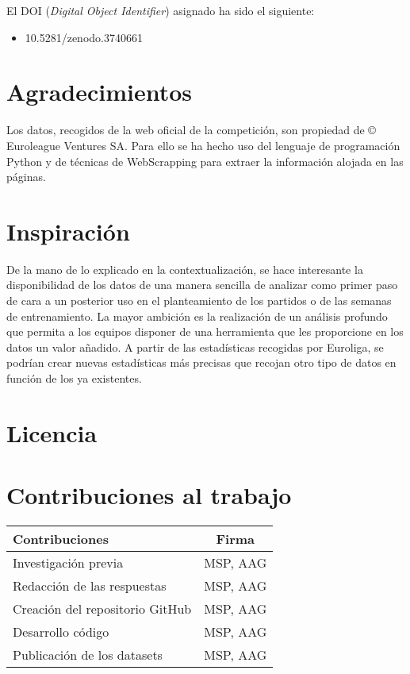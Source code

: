 \documentclass[]{article}
\providecommand{\tightlist}{%
  \setlength{\itemsep}{0pt}\setlength{\parskip}{0pt}}
\begin{document}
El DOI (\emph{Digital Object Identifier}) asignado ha sido el siguiente:

\begin{itemize}
\tightlist
\item
  10.5281/zenodo.3740661
\end{itemize}

\hypertarget{agradecimientos}{%
\section{Agradecimientos}\label{agradecimientos}}

Los datos, recogidos de la web oficial de la competición, son propiedad
de © Euroleague Ventures SA. Para ello se ha hecho uso del lenguaje de
programación Python y de técnicas de WebScrapping para extraer la
información alojada en las páginas.

\hypertarget{inspiraciuxf3n}{%
\section{Inspiración}\label{inspiraciuxf3n}}

De la mano de lo explicado en la contextualización, se hace interesante
la disponibilidad de los datos de una manera sencilla de analizar como
primer paso de cara a un posterior uso en el planteamiento de los
partidos o de las semanas de entrenamiento. La mayor ambición es la
realización de un análisis profundo que permita a los equipos disponer
de una herramienta que les proporcione en los datos un valor añadido. A
partir de las estadísticas recogidas por Euroliga, se podrían crear
nuevas estadísticas más precisas que recojan otro tipo de datos en
función de los ya existentes.

\hypertarget{licencia}{%
\section{Licencia}\label{licencia}}

\hypertarget{contribuciones-al-trabajo}{%
\section{Contribuciones al trabajo}\label{contribuciones-al-trabajo}}

\begin{longtable}[]{@{}lc@{}}
\toprule
\textbf{Contribuciones} & \textbf{Firma}\tabularnewline
\midrule
\endhead
Investigación previa & MSP, AAG\tabularnewline
Redacción de las respuestas & MSP, AAG\tabularnewline
Creación del repositorio GitHub & MSP, AAG\tabularnewline
Desarrollo código & MSP, AAG\tabularnewline
Publicación de los datasets & MSP, AAG\tabularnewline
\bottomrule
\end{longtable}
\end{document}
